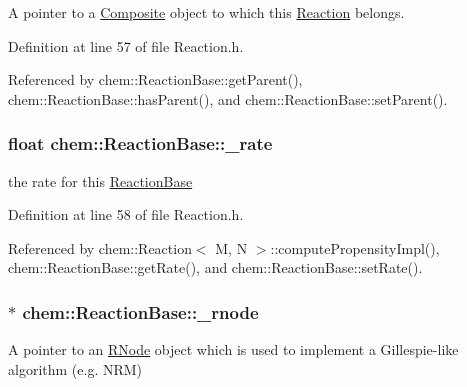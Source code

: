 A pointer to a \hyperlink{classchem_1_1Composite}{Composite} object to which this \hyperlink{classchem_1_1Reaction}{Reaction} belongs. 



Definition at line 57 of file Reaction.\-h.



Referenced by chem\-::\-Reaction\-Base\-::get\-Parent(), chem\-::\-Reaction\-Base\-::has\-Parent(), and chem\-::\-Reaction\-Base\-::set\-Parent().

\hypertarget{classchem_1_1ReactionBase_a787107879dc2a24b789997bac1eb1634}{
\subsubsection[{\-\_\-rate}]{\setlength{\rightskip}{0pt plus 5cm}float {\bf chem\-::\-Reaction\-Base\-::\-\_\-rate}}}\label{classchem_1_1ReactionBase_a787107879dc2a24b789997bac1eb1634}


the rate for this \hyperlink{classchem_1_1ReactionBase}{Reaction\-Base} 



Definition at line 58 of file Reaction.\-h.



Referenced by chem\-::\-Reaction$<$ M, N $>$\-::compute\-Propensity\-Impl(), chem\-::\-Reaction\-Base\-::get\-Rate(), and chem\-::\-Reaction\-Base\-::set\-Rate().

\hypertarget{classchem_1_1ReactionBase_aedaf23c8b9f80598fc68f715309a6aa3}{
\subsubsection[{\-\_\-rnode}]{$\ast$ {\bf chem\-::\-Reaction\-Base\-::\-\_\-rnode}}}\label{classchem_1_1ReactionBase_aedaf23c8b9f80598fc68f715309a6aa3}


A pointer to an \hyperlink{classchem_1_1RNode}{R\-Node} object which is used to implement a Gillespie-\/like algorithm (e.\-g. N\-R\-M) 



